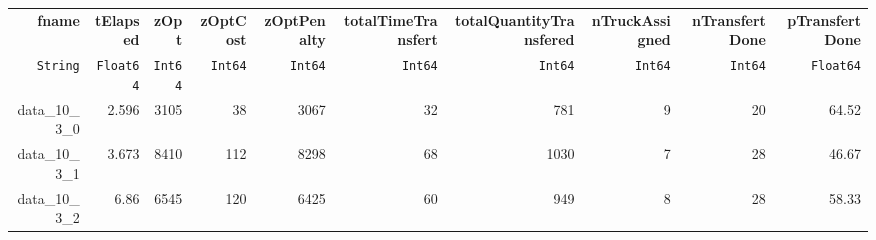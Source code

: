 \begin{tabular}{rrrrrrrrrr}
  \hline
  \textbf{fname} & \textbf{tElapsed} & \textbf{zOpt} & \textbf{zOptCost} & \textbf{zOptPenalty} & \textbf{totalTimeTransfert} & \textbf{totalQuantityTransfered} & \textbf{nTruckAssigned} & \textbf{nTransfertDone} & \textbf{pTransfertDone} \\
  \texttt{String} & \texttt{Float64} & \texttt{Int64} & \texttt{Int64} & \texttt{Int64} & \texttt{Int64} & \texttt{Int64} & \texttt{Int64} & \texttt{Int64} & \texttt{Float64} \\\hline
  data\_10\_3\_0 & 2.596 & 3105 & 38 & 3067 & 32 & 781 & 9 & 20 & 64.52 \\
  data\_10\_3\_1 & 3.673 & 8410 & 112 & 8298 & 68 & 1030 & 7 & 28 & 46.67 \\
  data\_10\_3\_2 & 6.86 & 6545 & 120 & 6425 & 60 & 949 & 8 & 28 & 58.33 \\\hline
\end{tabular}
